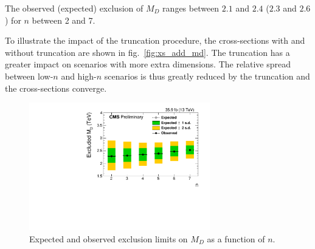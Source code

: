 The observed (expected) exclusion of $M_{D}$ ranges between $2.1$ and $2.4$ \TeV ($2.3$ and $2.6$ \TeV) for $n$ between 2 and 7.

To illustrate the impact of the truncation procedure, the cross-sections with and without truncation are shown in fig.~\ref{fig:xs_add_md}.
The truncation has a greater impact on scenarios with more extra dimensions. The relative spread between low-$n$ and high-$n$ scenarios is thus greatly reduced by the truncation and the cross-sections converge.

\begin{figure}[hbtp]
  \centering
  \includegraphics[width=0.7\textwidth]{figures/ADD/add_limit_md.pdf}
  \caption{Expected and observed exclusion limits on $M_{D}$ as a function of $n$.
  }
  \label{fig:limits_add_md}
\end{figure}

